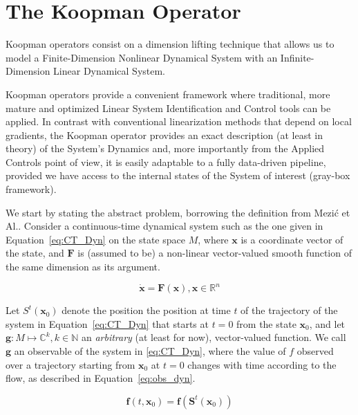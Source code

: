 \documentclass{article}
\begin{document}
\section{The Koopman Operator}

    Koopman operators consist on a dimension lifting technique that allows us to model a Finite-Dimension Nonlinear Dynamical System with an Infinite-Dimension Linear Dynamical System.
    
    Koopman operators provide a convenient framework where traditional, more mature and optimized Linear System Identification and Control tools can be applied. In contrast with conventional linearization methods that depend on local gradients, the Koopman operator provides an exact description (at least in theory) of the System's Dynamics and, more importantly from the Applied Controls point of view, it is easily adaptable to a fully data-driven pipeline, provided we have access to the internal states of the System of interest (gray-box framework).

    We start by stating the abstract problem, borrowing the definition from
    Mezić et Al.\cite{Koopman_Basics}. Consider a continuous-time dynamical system such as the one given in Equation~\ref{eq:CT_Dyn} on the state space $M$, where $\mathbf{x}$ is a coordinate vector of the state, and $\textbf{F}$ is (assumed to be) a non-linear vector-valued smooth function of the same dimension as its argument.

    \begin{equation} \label{eq:CT_Dyn}
        \mathbf{\dot{x}} = \mathbf{F}\left( \mathbf{x} \right) , \mathbf{x} \in \mathbb{R}^n
    \end{equation}
    
    Let $S^t(\mathbf{x}_0)$ denote the position the position at time $t$ of the trajectory of the system in Equation~\ref{eq:CT_Dyn} that starts at $t=0$ from the state $\mathbf{x}_0$, and let $\mathbf{g}:M \mapsto \mathbb{C}^k,k \in \mathbb{N}$ an \textit{arbitrary} (at least for now), vector-valued function. We call $\mathbf{g}$ an observable of the system in \ref{eq:CT_Dyn}, where the value of $f$ observed over a trajectory starting from $\mathbf{x}_0$ at $t=0$ changes with time according to the flow, as described in Equation~\ref{eq:obs_dyn}.

    \begin{equation} \label{eq:obs_dyn}
        \mathbf{f}\left(t,\mathbf{x}_0\right) = \mathbf{f} \left(\mathbf{S}^t\left(\mathbf{x}_0\right)\right)
    \end{equation}
    
\end{document}
